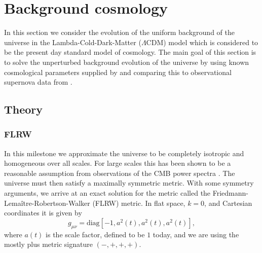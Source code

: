 \documentclass[%
reprint,
 amsmath,amssymb,
 aps,
]{revtex4-2}
\begin{document}
\section{Background cosmology}
\label{sec:1}
In this section we consider the evolution of the uniform background of the universe in the Lambda-Cold-Dark-Matter ($\Lambda$CDM) model which is considered to be the present day standard model of cosmology. The main goal of this section is to solve the unperturbed background evolution of the universe by using known cosmological parameters supplied by \cite{Planck:2018vyg} and comparing this to observational supernova data from \cite{SDSS:2014iwm}.

\subsection{Theory}
\subsubsection{FLRW}
In this milestone we approximate the universe to be completely isotropic and homogeneous over all scales. For large scales this has been shown to be a reasonable assumption from observations of the CMB power spectra \cite{Dodelson:2003ft}. The universe must then satisfy a maximally symmetric metric. With some symmetry arguments, we arrive at an exact solution for the metric called the Friedmann-Lema\^itre-Robertson-Walker (FLRW) metric. In flat space, $k=0$, and Cartesian coordinates it is given by
\[g_{\mu\nu}=\text{diag}\left[-1,a^2(t),a^2(t),a^2(t)\right],\]
where $a(t)$ is the scale factor, defined to be $1$ today, and we are using the mostly plus metric signature $(-,+,+,+)$. 
\end{document}

